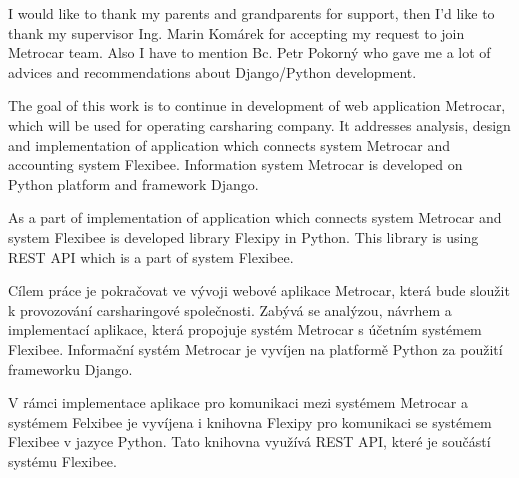 \documentclass[11pt,twoside,a4paper]{book}
\begin{document}
\acknowledgements
\noindent
I would like to thank my parents and grandparents for support, then I'd like to thank my supervisor Ing. Marin Komárek for 
accepting my request to join Metrocar team. Also I have to mention Bc. Petr Pokorný who gave me a lot of advices and recommendations about Django/Python development.





 
\abstractpage

The goal of this work is to continue in development of web application Metrocar, which will be used for operating 
carsharing company. It addresses analysis, design and implementation of application which connects system Metrocar and 
accounting system Flexibee. Information system Metrocar is developed on Python platform and framework Django.

As a part of implementation of application which connects system Metrocar and system Flexibee is developed library Flexipy in Python.
This library is using REST API which is a part of system Flexibee.   

\baselineskip

\noindent
Cílem práce je pokračovat ve vývoji webové aplikace Metrocar, která bude sloužit k provozování carsharingové společnosti. Zabývá se 
analýzou, návrhem a implementací aplikace, která propojuje systém Metrocar s účetním systémem Flexibee. Informační systém Metrocar 
je vyvíjen na platformě Python za použití frameworku Django. 

V rámci implementace aplikace pro komunikaci mezi systémem Metrocar a 
systémem Felxibee je vyvíjena i knihovna Flexipy pro komunikaci se systémem Flexibee v jazyce Python. Tato knihovna využívá 
REST API, které je součástí systému Flexibee. 


\tableofcontents



\listoffigures


\end{document}
